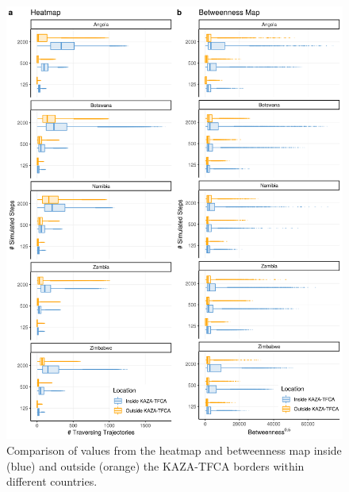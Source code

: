 \documentclass[abstract=off,10pt,a4paper,bibliography=totocnumbered]{article}
\begin{document}
\begin{figure}[hbtp]
 \begin{center}
  \includegraphics[width = \textwidth]{99_MapComparisonCountries.png}
  \caption{Comparison of values from the heatmap and betweenness map inside
  (blue) and outside (orange) the KAZA-TFCA borders within different countries.}
  \label{MapComparisonCountries}
 \end{center}
\end{figure}

\newpage
\end{document}
